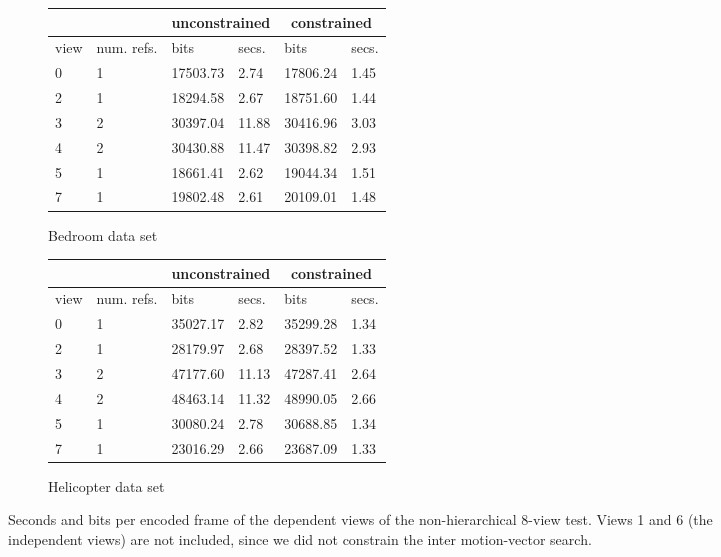 \documentclass[12pt]{article}
\begin{document}
\begin{figure}
\centering\small
\begin{subfigure}{.5\textwidth}
\centering
\begin{tabular}{|l|l|l|l|l|l|}
\multicolumn{2}{c}{} & \multicolumn{2}{c}{unconstrained} & \multicolumn{2}{c}{constrained} \\ \hline
view & num. refs.    & bits            & secs.           & bits            & secs.         \\ \hline
0    & 1             & 17503.73        & 2.74            & 17806.24        & 1.45          \\ \hline
2    & 1             & 18294.58        & 2.67            & 18751.60        & 1.44          \\ \hline
3    & 2             & 30397.04        & 11.88           & 30416.96        & 3.03          \\ \hline
4    & 2             & 30430.88        & 11.47           & 30398.82        & 2.93          \\ \hline
5    & 1             & 18661.41        & 2.62            & 19044.34        & 1.51          \\ \hline
7    & 1             & 19802.48        & 2.61            & 20109.01        & 1.48          \\ \hline
\end{tabular}
\caption{Bedroom data set}
\end{subfigure}
\begin{subfigure}{.5\textwidth}
\centering
\begin{tabular}{|l|l|l|l|l|l|}
\multicolumn{2}{c}{} & \multicolumn{2}{c}{unconstrained} & \multicolumn{2}{c}{constrained} \\ \hline
view & num. refs.    & bits            & secs.           & bits            & secs.         \\ \hline
0    & 1             & 35027.17        & 2.82            & 35299.28        & 1.34          \\ \hline
2    & 1             & 28179.97        & 2.68            & 28397.52        & 1.33          \\ \hline
3    & 2             & 47177.60        & 11.13           & 47287.41        & 2.64          \\ \hline
4    & 2             & 48463.14        & 11.32           & 48990.05        & 2.66          \\ \hline
5    & 1             & 30080.24        & 2.78            & 30688.85        & 1.34          \\ \hline
7    & 1             & 23016.29        & 2.66            & 23687.09        & 1.33          \\ \hline
\end{tabular}
\caption{Helicopter data set}
\end{subfigure}
\caption{
Seconds and bits per encoded frame of the dependent views of the
non-hierarchical 8-view test. Views 1 and 6 (the independent views) are not
included, since we did not constrain the inter motion-vector search.
}
\end{figure}
\end{document}
